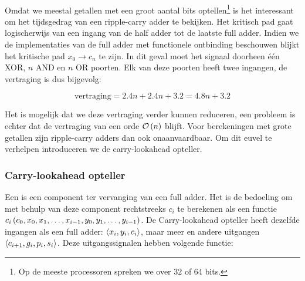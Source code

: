 \paragraph{}
Omdat we meestal getallen met een groot aantal bits optellen\footnote{Op de meeste processoren spreken we over $32$ of $64$ bits.} is het interessant om het tijdsgedrag van een ripple-carry adder te bekijken. Het kritisch pad gaat logischerwijs van een ingang van de half adder tot de laatste full adder. Indien we de implementaties van de full adder met functionele ontbinding beschouwen blijkt het kritische pad $x_0\rightarrow c_n$ te zijn. In dit geval moet het signaal doorheen \'e\'en XOR, $n$ AND en $n$ OR poorten. Elk van deze poorten heeft twee ingangen, de vertraging is dus bijgevolg:

\begin{equation}
\mbox{vertraging}=2.4n+2.4n+3.2=4.8n+3.2
\end{equation}

Het is mogelijk dat we deze vertraging verder kunnen reduceren, een probleem is echter dat de vertraging van een orde $\mathcal{O}\left( n \right)$ blijft. Voor berekeningen met grote getallen zijn ripple-carry adders dan ook onaanvaardbaar. Om dit euvel te verhelpen introduceren we de carry-lookahead opteller.

\subsubsection{Carry-lookahead opteller}
Een  is een component ter vervanging van een full adder. Het is de bedoeling om met behulp van deze component rechtstreeks $c_i$ te berekenen als een functie $c_i\left( c_0,x_0,x_1,\ldots,x_{i-1},y_0,y_1,\ldots,y_{i-1} \right)$. De Carry-lookahead opteller heeft dezelfde ingangen als een full adder: $\left\langle x_i,y_i,c_i \right\rangle$, maar meer en andere uitgangen $\left\langle c_{i+1},g_i,p_i,s_i \right\rangle$. Deze uitgangssignalen hebben volgende functie:

